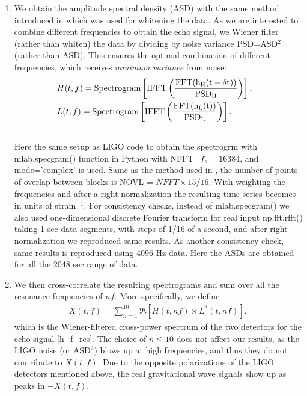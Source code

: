 \documentclass[12pt]{article}
\newcommand{\nn}{\nonumber}
\begin{document}
\begin{enumerate}
\item We obtain the amplitude spectral density (ASD) with the same method introduced in \cite{GW150914} which was used for whitening the data. As we are interested to combine different frequencies to obtain the echo signal, we Wiener filter (rather than whiten) the data by dividing by noise variance PSD=ASD$^2$ (rather than ASD). This ensures the optimal combination of different frequencies, which receives {\it minimum variance} from noise:%
\begin{eqnarray}
&H(t,f)=\rm{Spectrogram}\left[ \rm{IFFT}\left( \frac{\rm{FFT}(h_{H}(t-\delta t))}{PSD_{H}} \right) \right],& \nn\\ 
&L(t,f)=\rm{Spectrogram}\left[ \rm{IFFT}\left( \frac{\rm{FFT}(h_{L}(t))}{PSD_{L}} \right) \right].& \nn\\ &&
\end{eqnarray}
Here the same setup as LIGO code \cite{GW150914} to obtain the spectrogrm with mlab.specgram() function in Python with NFFT=$f_{s}=16384$, and mode='complex' is used.  Same as the method used in \cite{GW150914}, the number of points of overlap between blocks is NOVL = $NFFT \times 15/16$. %
 With weighting the frequencies and after a right normalization the resulting time series becomes in units of strain$^{-1}$. For consistency checks, instead of mlab.specgram() we also used one-dimensional discrete Fourier transform for real input np.fft.rfft() taking 1 sec data segments, with steps of 1/16 of a second, and after right normalization we reproduced same results. As another consistency check, same results is reproduced using 4096 Hz data. Here the ASDs are obtained for all the 2048 sec range of data.

\item We then cross-correlate the resulting spectrograms  and sum over all the resonance frequencies of $nf$. More specifically, we define %
\begin{eqnarray}
X(t,f)=\sum_{n=1}^{10} \Re\left[H(t,nf) \times L^*(t,nf)\right], \label{x_def}
\end{eqnarray}
which is the Wiener-filtered cross-power spectrum of the two detectors for the echo signal \ref{h_f_res}. The choice of $n\leq 10$ does not affect our results, as the LIGO noise (or ASD$^2$) blows up at high frequencies, and thus they do not contribute to $X(t,f)$. Due to the opposite polarizations of the LIGO detectors mentioned above, the real gravitational wave signals show up as peaks in $-X(t,f)$.


\end{enumerate}
\end{document}
